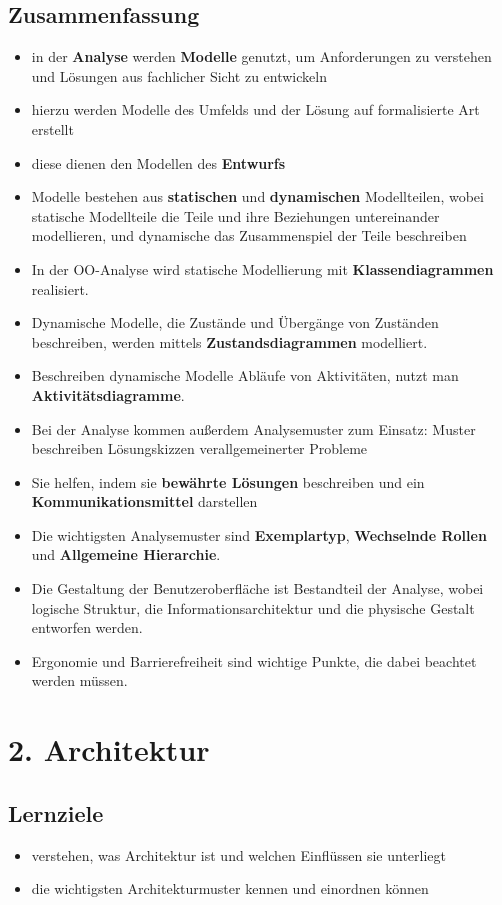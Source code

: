 \subsection*{Zusammenfassung}
\begin{itemize}
    \item in der \textbf{Analyse} werden \textbf{Modelle} genutzt, um Anforderungen zu verstehen und Lösungen aus fachlicher Sicht zu entwickeln
    \item hierzu werden Modelle des Umfelds und der Lösung auf formalisierte Art erstellt
    \item diese dienen den Modellen des \textbf{Entwurfs}
    \item Modelle bestehen aus \textbf{statischen} und \textbf{dynamischen} Modellteilen, wobei statische Modellteile die Teile und ihre Beziehungen untereinander modellieren, und dynamische das Zusammenspiel der Teile beschreiben
    \item In der OO-Analyse wird statische Modellierung mit \textbf{Klassendiagrammen} realisiert.
    \item[] Dynamische Modelle, die Zustände und Übergänge von Zuständen beschreiben, werden mittels \textbf{Zustandsdiagrammen} modelliert.
    \item[] Beschreiben dynamische Modelle Abläufe von Aktivitäten, nutzt man \textbf{Aktivitätsdiagramme}.
    \item Bei der Analyse kommen außerdem Analysemuster zum Einsatz: Muster beschreiben Lösungskizzen verallgemeinerter Probleme
    \item[] Sie helfen, indem sie \textbf{bewährte Lösungen} beschreiben und ein \textbf{Kommunikationsmittel} darstellen
    \item Die wichtigsten Analysemuster sind \textbf{Exemplartyp}, \textbf{Wechselnde Rollen} und \textbf{Allgemeine Hierarchie}.
    \item Die Gestaltung der Benutzeroberfläche ist Bestandteil der Analyse, wobei logische Struktur, die Informationsarchitektur und die physische Gestalt entworfen werden.
    \item[] Ergonomie und Barrierefreiheit sind wichtige Punkte, die dabei beachtet werden müssen.
\end{itemize}

\section*{2. Architektur}

\subsection*{Lernziele}
\begin{itemize}
    \item verstehen, was Architektur ist und welchen Einflüssen sie unterliegt
    \item die wichtigsten Architekturmuster kennen und einordnen können
\end{itemize}

